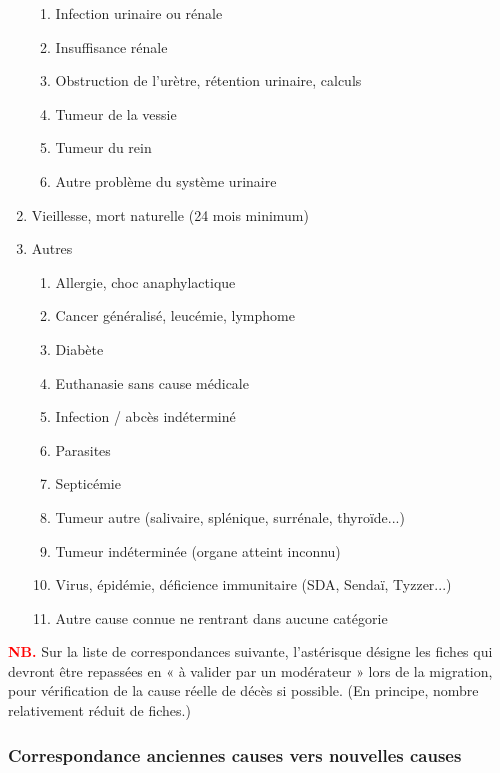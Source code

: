 \documentclass[a4paper,10pt]{article}
\newcommand\desire[1]{\noindent\textbf{\textcolor{red}{#1}}}
\begin{document}
\begin{enumerate}
\begin{enumerate}
\item Infection urinaire ou rénale
\item Insuffisance rénale
\item Obstruction de l’urètre, rétention urinaire, calculs
\item Tumeur de la vessie
\item Tumeur du rein
\item Autre problème du système urinaire
\end{enumerate}
\item Vieillesse, mort naturelle (24 mois minimum)
\item Autres
\begin{enumerate}
\item Allergie, choc anaphylactique
\item Cancer généralisé, leucémie, lymphome
\item Diabète
\item Euthanasie sans cause médicale
\item Infection / abcès indéterminé
\item Parasites
\item Septicémie
\item Tumeur autre (salivaire, splénique, surrénale, thyroïde...)
\item Tumeur indéterminée (organe atteint inconnu)
\item Virus, épidémie, déficience immunitaire (SDA, Sendaï, Tyzzer...)
\item Autre cause connue ne rentrant dans aucune catégorie
\end{enumerate}
\end{enumerate}

\desire{NB.} Sur la liste de correspondances suivante, l'astérisque désigne les fiches qui devront être repassées en « à valider par un modérateur » lors de la migration, pour vérification de la cause réelle de décès si possible. (En principe, nombre relativement réduit de fiches.)  

\subsubsection{Correspondance anciennes causes vers nouvelles causes}
\small
\end{document}
